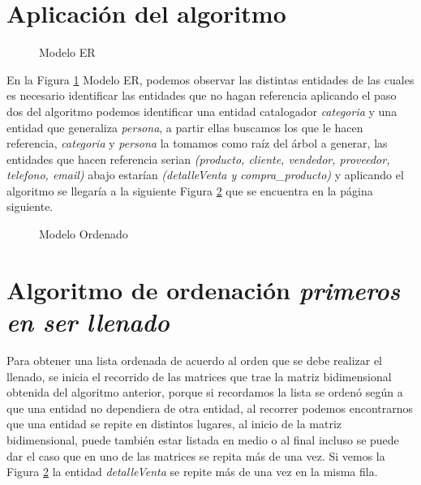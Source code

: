 \section{Aplicaci\'on del algoritmo}
\begin{figure}[H]
\centering
{}
\caption{Modelo ER} \label{fig:Modelo ER}
\end{figure}
En la Figura \ref{fig:Modelo ER} Modelo ER, podemos observar las distintas entidades de las cuales es necesario identificar las entidades que no hagan referencia aplicando el paso dos del algoritmo podemos identificar una entidad catalogador \emph{categoria} y una entidad que generaliza \emph{persona}, a partir ellas buscamos los que le hacen referencia, \textit{categoria} y \textit{persona} la tomamos como ra\'iz del \'arbol a generar, las entidades que hacen referencia serian \textit{(producto, cliente, vendedor, proveedor, telefono, email)} abajo estar\'ian \textit{(detalleVenta y compra\_producto)} y aplicando el algoritmo se llegar\'ia a la siguiente Figura \ref{fig:ModeloOrdenado} que se encuentra en la p\'agina siguiente.
\begin{figure}[H]
\centering
{}
\caption{Modelo Ordenado} \label{fig:ModeloOrdenado}
\end{figure}
\section{Algoritmo de ordenaci\'on \textit{primeros en ser llenado}}
\label{Algoritmo de ordenacion primeros en ser llenado}
Para obtener una lista ordenada de acuerdo al orden que se debe realizar el llenado, se inicia el recorrido de las matrices que trae la matriz bidimensional obtenida del algoritmo anterior, porque si recordamos la lista se orden\'o seg\'un a que una entidad no dependiera de otra entidad, al recorrer podemos encontrarnos que una entidad se repite en distintos lugares, al  inicio de la matriz bidimensional, puede tambi\'en estar listada en medio o al final incluso se puede dar el caso que en uno de las matrices se repita m\'as de una vez. Si vemos la Figura \ref{fig:ModeloOrdenado} la entidad \textit{detalleVenta} se repite m\'as de una vez en la misma fila.

